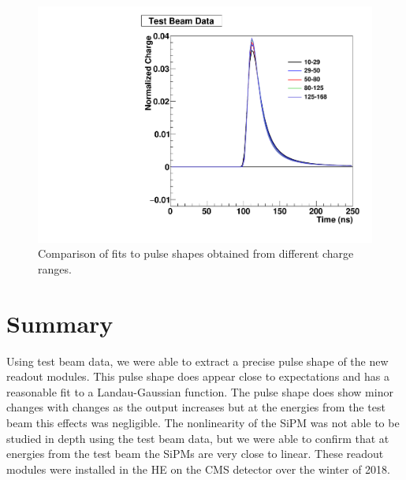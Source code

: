 \begin{figure}
\centering
\includegraphics[width=0.8\linewidth]{Figures/Overlap.pdf}
\caption{Comparison of fits to pulse shapes obtained from different charge ranges.}
\label{fig:Overlap}
\end{figure}


\section{Summary}

Using test beam data, we were able to extract a precise pulse shape of the new readout modules. This pulse shape does appear close to expectations and has a reasonable fit to a Landau-Gaussian function. The pulse shape does show minor changes with changes as the output increases but at the energies from the test beam this effects was negligible. The nonlinearity of the SiPM was not able to be studied in depth using the test beam data, but we were able to confirm that at energies from the test beam the SiPMs are very close to linear. These readout modules were installed in the HE on the CMS detector over the winter of 2018. 

